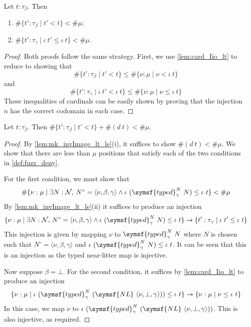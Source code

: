 \begin{lemma}
    \label{lem:mk_invImage_lt_le}
    Let \( t : \tau_\beta \).
    Then
    \begin{enumerate}
        \item \( \#\{ t' : \tau_\beta \mid t' < t \} < \#\mu \);
        \item \( \#\{ t' : \tau_\gamma \mid \iota\ t' \leq \iota\ t \} < \#\mu \).
    \end{enumerate}
\end{lemma}
\begin{proof}
    Both proofs follow the same strategy.
    First, we use \cref{lem:card_Iio_lt} to reduce to showing that
    \[ \#\{ t' : \tau_\beta \mid t' < t \} \leq \#\{ \nu : \mu \mid \nu < \iota\ t \} \]
    and
    \[ \#\{ t' : \tau_\gamma \mid \iota\ t' < \iota\ t \} \leq \#\{ \nu : \mu \mid \nu \leq \iota\ t \} \]
    These inequalities of cardinals can be easily shown by proving that the injection \( n \) has the correct codomain in each case.
\end{proof}
\begin{lemma}
    \label{lem:mk_fuzz_deny}
    Let \( t : \tau_\beta \).
    Then \( \#\{ t' : \tau_\beta \mid t' < t \} + \#(d\ t) < \#\mu \).
\end{lemma}
\begin{proof}
    By \cref{lem:mk_invImage_lt_le}(i), it suffices to show \( \#(d\ t) < \#\mu \).
    We show that there are less than \( \mu \) positions that satisfy each of the two conditions in \cref{def:fuzz_deny}.

    For the first condition, we must show that
    \[ \#\{ \nu : \mu \mid \exists N : \mathcal N,\, N^\circ = \langle \nu, \beta, \gamma \rangle \wedge \iota\ (\symsf{typed}^N_\gamma\ N) \leq \iota\ t \} < \#\mu \]
    By \cref{lem:mk_invImage_lt_le}(ii) it suffices to produce an injection
    \[ \{ \nu : \mu \mid \exists N : \mathcal N,\, N^\circ = \langle \nu, \beta, \gamma \rangle \wedge \iota\ (\symsf{typed}^N_\gamma\ N) \leq \iota\ t \} \to \{ t' : \tau_\gamma \mid \iota\ t' \leq \iota\ t \} \]
    This injection is given by mapping \( \nu \) to \( \symsf{typed}^N_\gamma\ N \) where \( N \) is chosen such that \( N^\circ = \langle \nu, \beta, \gamma \rangle \) and \( \iota\ (\symsf{typed}^N_\gamma\ N) \leq \iota\ t \).
    It can be seen that this is an injection as the typed near-litter map is injective.

    Now suppose \( \beta = \bot \).
    For the second condition, it suffices by \cref{lem:card_Iio_lt} to produce an injection
    \[ \{ \nu : \mu \mid \iota\ (\symsf{typed}^N_\gamma\ (\symsf{NL}\ \langle \nu, \bot, \gamma \rangle)) \leq \iota\ t \} \to \{ \nu : \mu \mid \nu \leq \iota\ t \} \]
    In this case, we map \( \nu \) to \( \iota\ (\symsf{typed}^N_\gamma\ (\symsf{NL}\ \langle \nu, \bot, \gamma \rangle)) \).
    This is also injective, as required.
\end{proof}

